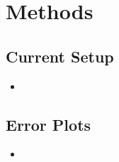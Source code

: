 \chapter{Methods}\label{ch:methods}




\section{Current Setup}
\begin{itemize}
    \item
\end{itemize}

\section{Error Plots}
\begin{itemize}
    \item
\end{itemize}











